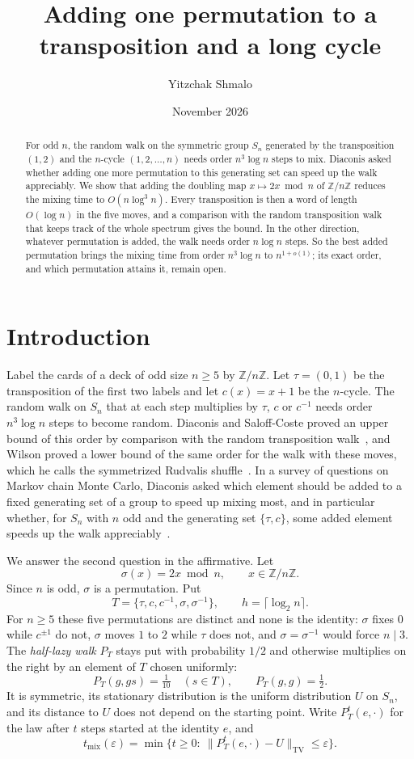 \documentclass[11pt]{amsart}
\title[One added permutation]{Adding one permutation to a transposition and a long cycle}
\author{Yitzchak Shmalo}
\date{November 2026}
\theoremstyle{remark}
\numberwithin{equation}{section}
\newcommand{\Z}{\mathbb{Z}}
\newcommand{\TV}{\mathrm{TV}}
\newcommand{\tmix}{t_{\mathrm{mix}}}
\begin{document}
\begin{abstract}
For odd $n$, the random walk on the symmetric group $S_n$ generated by the transposition $(1,2)$ and the $n$-cycle $(1,2,\dots,n)$ needs order $n^3\log n$ steps to mix. Diaconis asked whether adding one more permutation to this generating set can speed up the walk appreciably. We show that adding the doubling map $x\mapsto 2x \bmod n$ of $\Z/n\Z$ reduces the mixing time to $O(n\log^3 n)$. Every transposition is then a word of length $O(\log n)$ in the five moves, and a comparison with the random transposition walk that keeps track of the whole spectrum gives the bound. In the other direction, whatever permutation is added, the walk needs order $n\log n$ steps. So the best added permutation brings the mixing time from order $n^3\log n$ to $n^{1+o(1)}$; its exact order, and which permutation attains it, remain open.
\end{abstract}

\maketitle

\section{Introduction}\label{sec:intro}

Label the cards of a deck of odd size $n\ge 5$ by $\Z/n\Z$. Let $\tau=(0,1)$ be the transposition of the first two labels and let $c(x)=x+1$ be the $n$-cycle. The random walk on $S_n$ that at each step multiplies by $\tau$, $c$ or $c^{-1}$ needs order $n^3\log n$ steps to become random. Diaconis and Saloff-Coste proved an upper bound of this order by comparison with the random transposition walk~\cite[Theorem~2]{DSC}, and Wilson proved a lower bound of the same order for the walk with these moves, which he calls the symmetrized Rudvalis shuffle~\cite[Theorem~1]{Wilson}. In a survey of questions on Markov chain Monte Carlo, Diaconis asked which element should be added to a fixed generating set of a group to speed up mixing most, and in particular whether, for $S_n$ with $n$ odd and the generating set $\{\tau,c\}$, some added element speeds up the walk appreciably~\cite[Question~3]{Diaconis13}.

We answer the second question in the affirmative. Let
\[
 \sigma(x)=2x \bmod n,\qquad x\in\Z/n\Z .
\]
Since $n$ is odd, $\sigma$ is a permutation. Put
\[
 T=\{\tau,c,c^{-1},\sigma,\sigma^{-1}\},\qquad h=\lceil\log_2 n\rceil .
\]
For $n\ge5$ these five permutations are distinct and none is the identity: $\sigma$ fixes $0$ while $c^{\pm1}$ do not, $\sigma$ moves $1$ to $2$ while $\tau$ does not, and $\sigma=\sigma^{-1}$ would force $n\mid 3$. The \emph{half-lazy walk} $P_T$ stays put with probability $1/2$ and otherwise multiplies on the right by an element of $T$ chosen uniformly:
\[
 P_T(g,gs)=\tfrac1{10}\quad(s\in T),\qquad P_T(g,g)=\tfrac12 .
\]
It is symmetric, its stationary distribution is the uniform distribution $U$ on $S_n$, and its distance to $U$ does not depend on the starting point. Write $P_T^t(e,\cdot)$ for the law after $t$ steps started at the identity $e$, and
\[
 \tmix(\varepsilon)=\min\{t\ge0:\ \|P_T^t(e,\cdot)-U\|_{\TV}\le\varepsilon\}.
\]
\end{document}
